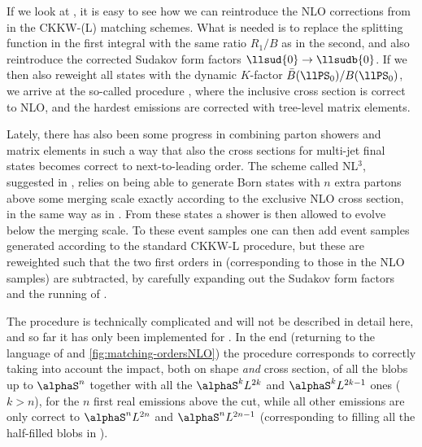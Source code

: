 \label{sec:nlo-merging}

If we look at , it is easy to see how we
can reintroduce the NLO corrections from \POWHEG in the CKKW-(L)
matching schemes. What is needed is to replace the splitting function
in the first integral with the same ratio $R_1/B$ as in the second,
and also reintroduce the corrected Sudakov form factors
$\llsud{0}\to\llsudb{0}$. If we then also reweight all states with the
dynamic $K$-factor $\bar{B}(\llPS_0)/B(\llPS_0)$, we arrive at the
so-called \MENLOPS procedure \cite{Hamilton:2010wh}, where the inclusive
cross section is correct to NLO, and the hardest emissions are
corrected with tree-level matrix elements.

Lately, there has also been some progress in combining parton showers
and matrix elements in such a way that also the cross sections for
multi-jet final states becomes correct to next-to-leading order.  The
scheme called NL$^3$, suggested in \cite{Lavesson:2008ah}, relies on
being able to generate Born states with $n$ extra partons above some
merging scale exactly according to the exclusive NLO cross section, in
the same way as in . From these
states a shower is then allowed to evolve below the merging scale. To
these event samples one can then add event samples generated according to
the standard CKKW-L procedure, but these are reweighted such that the
two first orders in \alphaS (corresponding to those in the NLO
samples) are subtracted, by carefully expanding out the Sudakov form
factors and the running of \alphaS.

The procedure is technically complicated and will not be described in
detail here, and so far it has only been implemented for \lleetoj. In
the end (returning to the language of  and
\ref{fig:matching-ordersNLO}) the procedure corresponds to correctly
taking into account the impact, both on shape \emph{and} cross
section, of all the blobs up to $\alphaS^n$ together with all the
$\alphaS^kL^{2k}$ and $\alphaS^kL^{2k-1}$ ones ($k>n$), for the
$n$ first real emissions above the cut, while all other emissions are
only correct to $\alphaS^nL^{2n}$ and $\alphaS^nL^{2n-1}$
(corresponding to filling all the half-filled blobs in
).

\label{sec:matching-outlook}


